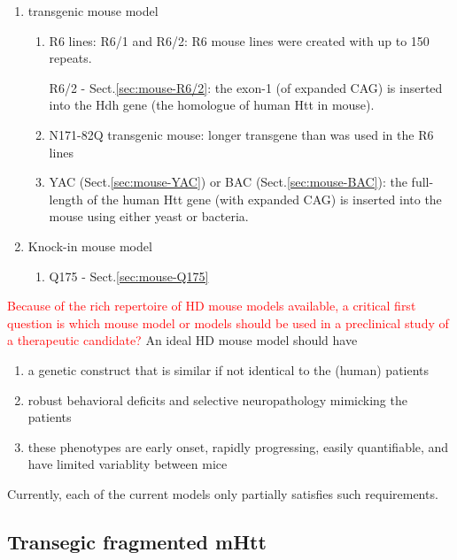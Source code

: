 \begin{enumerate}
  \item transgenic mouse model
  \begin{enumerate}
  \item R6 lines: R6/1 and R6/2: R6 mouse lines were created with up to 150 repeats. 
  
  R6/2 - Sect.\ref{sec:mouse-R6/2}: the exon-1 (of expanded CAG) is inserted
  into the Hdh gene (the homologue of human Htt in mouse).
  
  \item  N171-82Q transgenic mouse: longer transgene than was used in the R6
  lines
  
  
  \item YAC (Sect.\ref{sec:mouse-YAC}) or BAC
  (Sect.\ref{sec:mouse-BAC}): the full-length of the human Htt gene (with
  expanded CAG) is inserted into the mouse using either yeast or bacteria.
  \end{enumerate}
  
  
  \item Knock-in mouse model
  \begin{enumerate}
    \item  Q175 - Sect.\ref{sec:mouse-Q175} 
  \end{enumerate}
\end{enumerate}

\textcolor{red}{Because of the rich repertoire of HD mouse models available, a
critical first question is which mouse model or models should be used in a
preclinical study of a therapeutic candidate?}
An ideal HD mouse model should have
\begin{enumerate}
  \item a genetic construct that is similar if not identical to the
  (human) patients

  \item robust behavioral deficits and selective neuropathology mimicking the
  patients

  \item these phenotypes are early onset, rapidly progressing, easily
  quantifiable, and have limited variablity between mice
  
\end{enumerate}
Currently, each of the current models only partially satisfies such
requirements.

\subsection{Transegic fragmented mHtt}
\label{sec:HD-mouse-model-fragment-mHtt}

